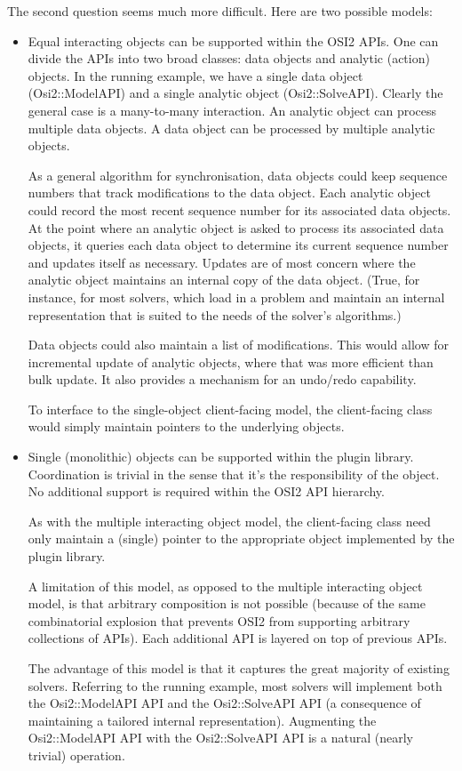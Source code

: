 \documentclass{article}
\newcommand{\OsiTwo}{OSI2\xspace}
\newcommand{\OsiTwoModel}{Osi2::ModelAPI\xspace}
\newcommand{\OsiTwoSolve}{Osi2::SolveAPI\xspace}
\begin{document}
The second question seems much more difficult.
Here are two possible models:
\begin{itemize}
  \item
  Equal interacting objects can be supported within the \OsiTwo APIs.
  One can divide the APIs into two broad classes: data objects and analytic
  (action) objects.
  In the running example, we have a single data object (\OsiTwoModel) and a
  single analytic object (\OsiTwoSolve).
  Clearly the general case is a many-to-many interaction.
  An analytic object can process multiple data objects.
  A data object can be processed by multiple analytic objects.

  As a general algorithm for synchronisation, data objects could keep sequence
  numbers that track modifications to the data object.
  Each analytic object could record the most recent sequence number for its
  associated data objects.
  At the point where an analytic object is asked to process its associated
  data objects, it queries each data object to determine its current sequence
  number and updates itself as necessary.
  Updates are of most concern where the analytic object maintains an internal
  copy of the data object.
  (True, for instance, for most solvers, which load in a problem and maintain
  an internal representation that is suited to the needs of the solver's
  algorithms.)

  Data objects could also maintain a list of modifications.
  This would allow for incremental update of analytic objects, where that was
  more efficient than bulk update.
  It also provides a mechanism for an undo/redo capability.

  To interface to the single-object client-facing model, the client-facing class
  would simply maintain pointers to the underlying objects.

  \item
  Single (monolithic) objects can be supported within the plugin library.
  Coordination is trivial in the sense that it's the responsibility of the
  object.
  No additional support is required within the \OsiTwo API hierarchy.

  As with the multiple interacting object model, the client-facing class
  need only maintain a (single) pointer to the appropriate object implemented
  by the plugin library.

  A limitation of this model, as opposed to the multiple interacting object
  model, is that arbitrary composition is not possible (because of the same
  combinatorial explosion that prevents \OsiTwo from supporting arbitrary
  collections of APIs).
  Each additional API is layered on top of previous APIs.

  The advantage of this model is that it captures the great majority of
  existing solvers.
  Referring to the running example, most solvers will implement both the
  \OsiTwoModel API and the \OsiTwoSolve API (a consequence of maintaining a
  tailored internal representation).
  Augmenting the \OsiTwoModel API with the \OsiTwoSolve API is a natural
  (nearly trivial) operation.
\end{itemize}
\end{document}
